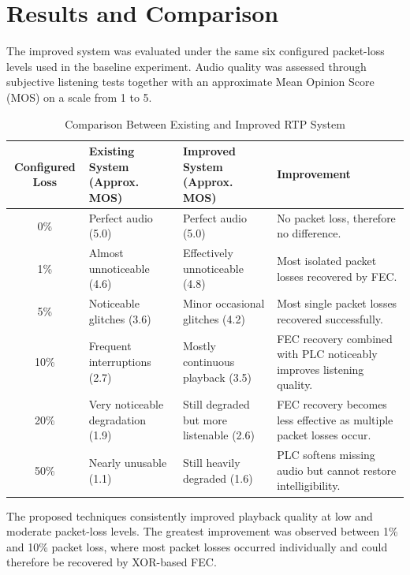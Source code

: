 \documentclass[conference]{IEEEtran}
\begin{document}
\section{Results and Comparison}

The improved system was evaluated under the same six configured packet-loss levels used in the baseline experiment. Audio quality was assessed through subjective listening tests together with an approximate Mean Opinion Score (MOS) on a scale from 1 to 5.

\begin{table}[!t]
\caption{Comparison Between Existing and Improved RTP System}
\centering
\begin{tabular}{|c|p{4cm}|p{4cm}|p{6cm}|}
\hline
Configured Loss &
Existing System (Approx. MOS) &
Improved System (Approx. MOS) &
Improvement \\

\hline
0\% &
Perfect audio (5.0) &
Perfect audio (5.0) &
No packet loss, therefore no difference. \\

\hline
1\% &
Almost unnoticeable (4.6) &
Effectively unnoticeable (4.8) &
Most isolated packet losses recovered by FEC. \\

\hline
5\% &
Noticeable glitches (3.6) &
Minor occasional glitches (4.2) &
Most single packet losses recovered successfully. \\

\hline
10\% &
Frequent interruptions (2.7) &
Mostly continuous playback (3.5) &
FEC recovery combined with PLC noticeably improves listening quality. \\

\hline
20\% &
Very noticeable degradation (1.9) &
Still degraded but more listenable (2.6) &
FEC recovery becomes less effective as multiple packet losses occur. \\

\hline
50\% &
Nearly unusable (1.1) &
Still heavily degraded (1.6) &
PLC softens missing audio but cannot restore intelligibility. \\

\hline
\end{tabular}
\label{tab:comparison}
\end{table}

The proposed techniques consistently improved playback quality at low and moderate packet-loss levels. The greatest improvement was observed between 1\% and 10\% packet loss, where most packet losses occurred individually and could therefore be recovered by XOR-based FEC.
\end{document}
